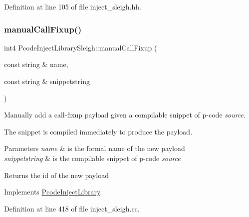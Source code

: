 Definition at line 105 of file inject\+\_\+sleigh.\+hh.

\mbox{\label{class_pcode_inject_library_sleigh_a4cce009469fb3679881ea73bc2ed9284}} 
\subsubsection{\texorpdfstring{manualCallFixup()}{manualCallFixup()}}
{\footnotesize\ttfamily int4 Pcode\+Inject\+Library\+Sleigh\+::manual\+Call\+Fixup (\begin{DoxyParamCaption}\item[{const string \&}]{name,  }\item[{const string \&}]{snippetstring }\end{DoxyParamCaption})\hspace{0.3cm}{\ttfamily [virtual]}}



Manually add a call-\/fixup payload given a compilable snippet of p-\/code {\itshape source}. 

The snippet is compiled immediately to produce the payload. 
\begin{DoxyParams}{Parameters}
{\em name} & is the formal name of the new payload \\
\hline
{\em snippetstring} & is the compilable snippet of p-\/code {\itshape source} \\
\hline
\end{DoxyParams}
\begin{DoxyReturn}{Returns}
the id of the new payload 
\end{DoxyReturn}


Implements \mbox{\hyperlink{class_pcode_inject_library_a0e360443cbc6ff94ea71d197882c55a8}{Pcode\+Inject\+Library}}.



Definition at line 418 of file inject\+\_\+sleigh.\+cc.

